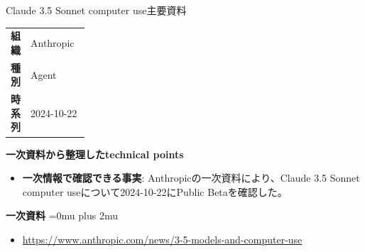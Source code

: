 \begin{technicalnote}{Claude 3.5 Sonnet computer use}{主要資料}
\begingroup
\begin{tabularx}{\linewidth}{@{}>{\bfseries}p{0.22\linewidth}X@{}}
組織 & Anthropic \\
種別 & Agent \\
時系列 & 2024-10-22 \\
\end{tabularx}
\smallskip
{\bfseries 一次資料から整理したtechnical points}
\begin{itemize}[leftmargin=1.5em,itemsep=0.35em]
\item \textbf{一次情報で確認できる事実}: Anthropicの一次資料により、Claude 3.5 Sonnet computer useについて2024-10-22にPublic Betaを確認した。
\end{itemize}
\begin{minipage}{\linewidth}
\begin{samepage}
{\bfseries 一次資料}
\begingroup\sloppy
\Urlmuskip=0mu plus 2mu\relax
\begin{itemize}[leftmargin=1.5em,itemsep=0.25em]
\item {\scriptsize\url{https://www.anthropic.com/news/3-5-models-and-computer-use}}
\end{itemize}
\endgroup
\end{samepage}
\end{minipage}
\endgroup
\end{technicalnote}
\medskip

